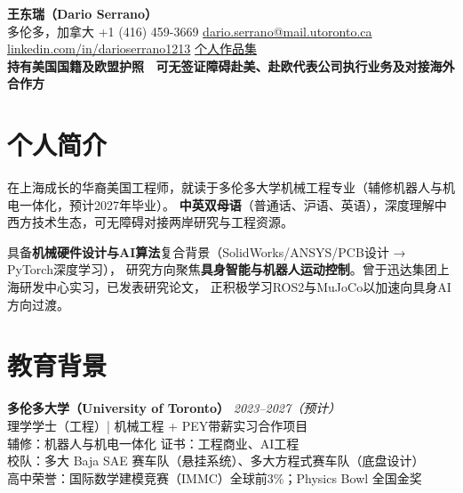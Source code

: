 \documentclass[a4paper,10pt]{article}
\newcommand{\entry}[2]{\textbf{#1} \hfill \textit{#2}}
\begin{document}
\pagestyle{empty}

\begin{center}
  {\large\bfseries 王东瑞（Dario Serrano）}\\[3pt]
  {\small
    多伦多，加拿大 \enspace\textbar\enspace
    +1 (416) 459-3669 \enspace\textbar\enspace
    \href{mailto:dario.serrano@mail.utoronto.ca}{dario.serrano@mail.utoronto.ca}\\[1pt]
    \href{https://linkedin.com/in/darioserrano1213}{linkedin.com/in/darioserrano1213}
    \enspace\textbar\enspace
    \href{https://lizmutt.github.io/darioserrano.github.io/}{个人作品集}
  }\\[3pt]
  {\small\bfseries
    持有美国国籍及欧盟护照 \textbar\
    可无签证障碍赴美、赴欧代表公司执行业务及对接海外合作方
  }
\end{center}

\vspace{1pt}

\section{个人简介}

在上海成长的华裔美国工程师，就读于多伦多大学机械工程专业（辅修机器人与机电一体化，预计2027年毕业）。
\textbf{中英双母语}（普通话、沪语、英语），深度理解中西方技术生态，可无障碍对接两岸研究与工程资源。

具备\textbf{机械硬件设计与AI算法}复合背景（SolidWorks/ANSYS/PCB设计 → PyTorch深度学习），
研究方向聚焦\textbf{具身智能与机器人运动控制}。曾于迅达集团上海研发中心实习，已发表研究论文，
正积极学习ROS2与MuJoCo以加速向具身AI方向过渡。

\section{教育背景}

\entry{多伦多大学（University of Toronto）}{2023--2027（预计）}\\
理学学士（工程）| 机械工程 + PEY带薪实习合作项目\\
辅修：机器人与机电一体化 \quad 证书：工程商业、AI工程\\
校队：多大 Baja SAE 赛车队（悬挂系统）、多大方程式赛车队（底盘设计）\\
高中荣誉：国际数学建模竞赛（IMMC）全球前3\%；Physics Bowl 全国金奖
\end{document}
